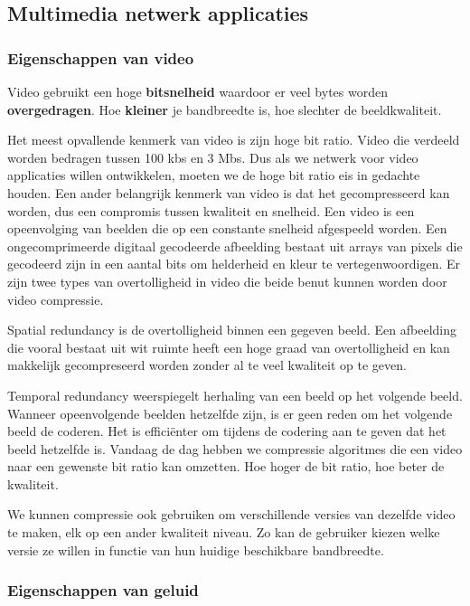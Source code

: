 \subsection{Multimedia netwerk applicaties}

\subsubsection{Eigenschappen van video}

\noindent Video gebruikt een hoge \textbf{bitsnelheid} waardoor er veel bytes worden \textbf{overgedragen}. Hoe \textbf{kleiner} je bandbreedte is, hoe slechter de beeldkwaliteit.

\noindent Het meest opvallende kenmerk van video is zijn hoge bit ratio. Video die verdeeld worden bedragen tussen 100 kbs en 3 Mbs. Dus als we netwerk voor video applicaties willen ontwikkelen, moeten we de hoge bit ratio eis in gedachte houden. Een ander belangrijk kenmerk van video is dat het gecompresseerd kan worden, dus een compromis tussen kwaliteit en snelheid. Een video is een opeenvolging van beelden die op een constante snelheid afgespeeld worden. Een ongecomprimeerde digitaal gecodeerde afbeelding bestaat uit arrays van pixels die gecodeerd zijn in een aantal bits om helderheid en kleur te vertegenwoordigen. Er zijn twee types van overtolligheid in video die beide benut kunnen worden door video compressie.

\noindent Spatial redundancy is de overtolligheid binnen een gegeven beeld. Een afbeelding die vooral bestaat uit wit ruimte heeft een hoge graad van overtolligheid en kan makkelijk gecompreseerd worden zonder al te veel kwaliteit op te geven.

\noindent Temporal redundancy weerspiegelt herhaling van een beeld op het volgende beeld. Wanneer opeenvolgende beelden hetzelfde zijn, is er geen reden om het volgende beeld de coderen. Het is efficiënter om tijdens de codering aan te geven dat het beeld hetzelfde is.
Vandaag de dag hebben we compressie algoritmes die een video naar een gewenste bit ratio kan omzetten. Hoe hoger de bit ratio, hoe beter de kwaliteit.

\noindent We kunnen compressie ook gebruiken om verschillende versies van dezelfde video te maken, elk op een ander kwaliteit niveau. Zo kan de gebruiker kiezen welke versie ze willen in functie van hun huidige beschikbare bandbreedte.



\subsubsection{Eigenschappen van geluid}

